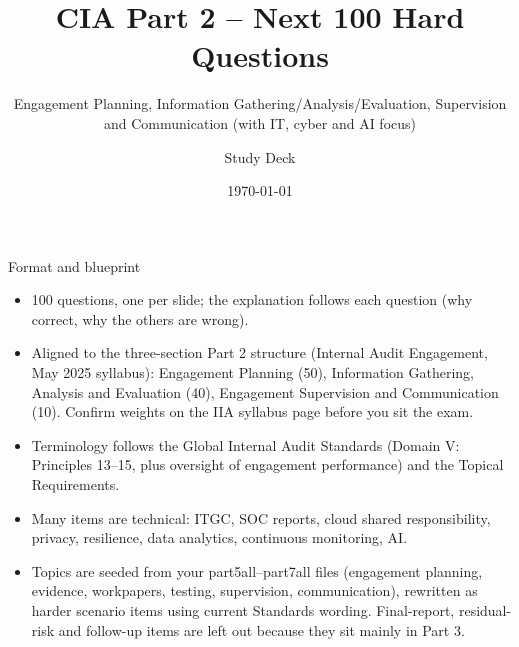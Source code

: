 \documentclass[aspectratio=169,10pt]{beamer}
\title{CIA Part 2 -- Next 100 Hard Questions}
\subtitle{Engagement Planning, Information Gathering/Analysis/Evaluation, Supervision and Communication (with IT, cyber and AI focus)}
\author{Study Deck}
\date{\today}
\begin{document}
\begin{frame}\titlepage\end{frame}
\begin{frame}{Format and blueprint}
\small
\begin{itemize}
\item 100 questions, one per slide; the explanation follows each question (why correct, why the others are wrong).
\item Aligned to the three-section Part 2 structure (Internal Audit Engagement, May 2025 syllabus): Engagement Planning (50), Information Gathering, Analysis and Evaluation (40), Engagement Supervision and Communication (10). Confirm weights on the IIA syllabus page before you sit the exam.
\item Terminology follows the Global Internal Audit Standards (Domain V: Principles 13--15, plus oversight of engagement performance) and the Topical Requirements.
\item Many items are technical: ITGC, SOC reports, cloud shared responsibility, privacy, resilience, data analytics, continuous monitoring, AI.
\item Topics are seeded from your part5all--part7all files (engagement planning, evidence, workpapers, testing, supervision, communication), rewritten as harder scenario items using current Standards wording. Final-report, residual-risk and follow-up items are left out because they sit mainly in Part 3.
\end{itemize}
\end{frame}
\end{document}
